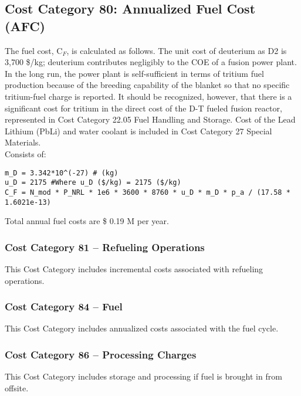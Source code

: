 \subsection{Cost Category 80: Annualized Fuel Cost (AFC)}

The fuel cost, C$_{F}$, is calculated as follows.  The unit cost of deuterium as D2 is 3,700 \$/kg; deuterium contributes negligibly to the COE of a fusion power plant. In the long run, the power plant is self-sufficient in terms of tritium fuel production because of the breeding capability of the blanket so that no specific tritium-fuel charge is reported. It should be recognized, however, that there is a significant cost for tritium in the direct cost of the D-T fueled fusion reactor, represented in Cost Category 22.05 Fuel Handling and Storage. Cost of the Lead Lithium (PbLi) and water coolant is included in Cost Category 27 Special Materials.\\

Consists of:  
\begin{verbatim} 
m_D = 3.342*10^(-27) # (kg)
u_D = 2175 #Where u_D ($/kg) = 2175 ($/kg) 
C_F = N_mod * P_NRL * 1e6 * 3600 * 8760 * u_D * m_D * p_a / (17.58 * 1.6021e-13)
\end{verbatim} 

Total annual fuel costs are \$ 0.19 M per year.

\subsubsection*{Cost Category 81 – Refueling Operations}
This Cost Category includes incremental costs associated with refueling operations.

\subsubsection*{Cost Category 84 – Fuel}
This Cost Category includes annualized costs associated with the fuel cycle.

\subsubsection*{Cost Category 86 – Processing Charges}
This Cost Category includes storage and processing if fuel is brought in from offsite.

